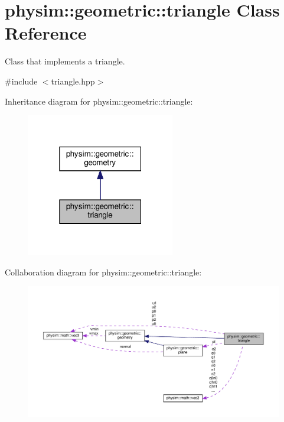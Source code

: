 \hypertarget{classphysim_1_1geometric_1_1triangle}{}\section{physim\+:\+:geometric\+:\+:triangle Class Reference}
\label{classphysim_1_1geometric_1_1triangle}


Class that implements a triangle.  




{\ttfamily \#include $<$triangle.\+hpp$>$}



Inheritance diagram for physim\+:\+:geometric\+:\+:triangle\+:\nopagebreak
\begin{figure}[H]
\begin{center}
\leavevmode
\includegraphics[width=183pt]{classphysim_1_1geometric_1_1triangle__inherit__graph}
\end{center}
\end{figure}


Collaboration diagram for physim\+:\+:geometric\+:\+:triangle\+:\nopagebreak
\begin{figure}[H]
\begin{center}
\leavevmode
\includegraphics[width=350pt]{classphysim_1_1geometric_1_1triangle__coll__graph}
\end{center}
\end{figure}
